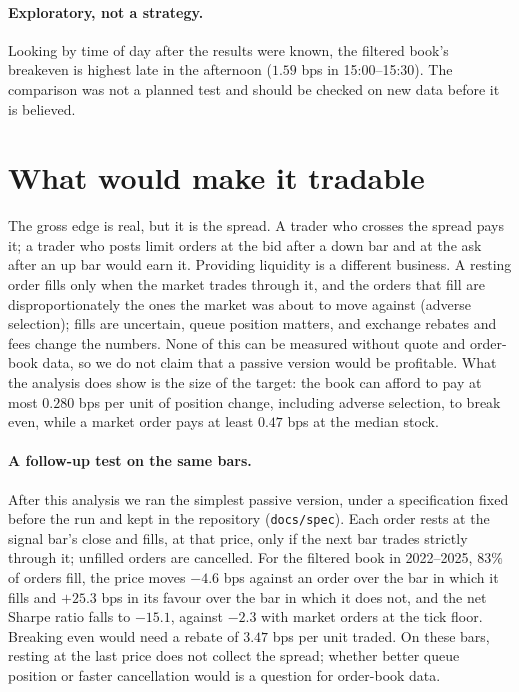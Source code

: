 \documentclass[11pt,a4paper]{article}
\begin{document}
\paragraph{Exploratory, not a strategy.} Looking by time of day after the results were known, the filtered
book's breakeven is highest late in the afternoon ($1.59$ bps in 15:00--15:30). The comparison was not a planned test and should be checked on new data before it is believed.

\section{What would make it tradable}
\label{sec:tradable}

The gross edge is real, but it is the spread. A trader who crosses the spread pays it; a trader who posts
limit orders at the bid after a down bar and at the ask after an up bar would earn it. Providing liquidity is a different business. A resting order fills only when the market trades through it, and the orders that fill are
disproportionately the ones the market was about to move against (adverse selection); fills are
uncertain, queue position matters, and exchange rebates and fees change the numbers. None of this can be
measured without quote and order-book data, so we do not claim that a passive version would be
profitable. What the analysis does show is the size of the target: the book can afford to pay
at most $0.280$ bps per unit of position change, including adverse selection, to break even, while a market
order pays at least $0.47$ bps at the median stock.

\paragraph{A follow-up test on the same bars.} After this analysis we ran the simplest passive version,
under a specification fixed before the run and kept in the repository (\texttt{docs/spec}).
Each order rests at the signal bar's close and fills, at that price, only if the next bar trades strictly
through it; unfilled orders are cancelled. For the filtered book in 2022--2025, $83\%$ of orders fill,
the price moves $-4.6$ bps against an order over the bar in which it fills and $+25.3$ bps in its
favour over the bar in which it does not, and the net Sharpe ratio falls to $-15.1$, against $-2.3$
with market orders at the tick floor. Breaking even would need a rebate of $3.47$ bps per unit
traded. On these bars, resting at the last price does not collect the spread; whether better queue
position or faster cancellation would is a question for order-book data.
\end{document}
